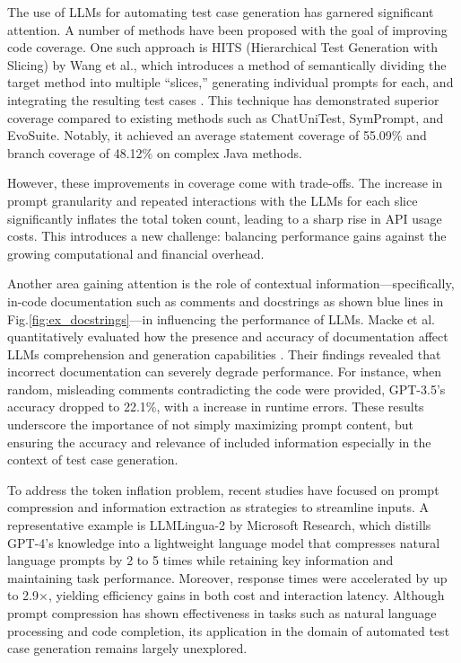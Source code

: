 The use of LLMs for automating test case generation has garnered significant attention. A number of methods have been proposed with the goal of improving code coverage. One such approach is HITS (Hierarchical Test Generation with Slicing) by Wang et al., which introduces a method of semantically dividing the target method into multiple “slices,” generating individual prompts for each, and integrating the resulting test cases \cite{hits}. This technique has demonstrated superior coverage compared to existing methods such as ChatUniTest, SymPrompt, and EvoSuite. Notably, it achieved an average statement coverage of 55.09\% and branch coverage of 48.12\% on complex Java methods.

However, these improvements in coverage come with trade-offs. The increase in prompt granularity and repeated interactions with the LLMs for each slice significantly inflates the total token count, leading to a sharp rise in API usage costs. This introduces a new challenge: balancing performance gains against the growing computational and financial overhead.

Another area gaining attention is the role of contextual information—specifically, in-code documentation such as comments and docstrings as shown blue lines in Fig.\ref{fig:ex_docstrings}—in influencing the performance of LLMs. Macke et al. quantitatively evaluated how the presence and accuracy of documentation affect LLMs comprehension and generation capabilities \cite{testing_the_effect_of_code_documentation}. Their findings revealed that incorrect documentation can severely degrade performance. For instance, when random, misleading comments contradicting the code were provided, GPT-3.5’s accuracy dropped to 22.1\%, with a increase in runtime errors. These results underscore the importance of not simply maximizing prompt content, but ensuring the accuracy and relevance of included information especially in the context of test case generation.

To address the token inflation problem, recent studies have focused on prompt compression and information extraction as strategies to streamline inputs. A representative example is LLMLingua-2 by Microsoft Research, which distills GPT-4’s knowledge into a lightweight language model that compresses natural language prompts by 2 to 5 times while retaining key information and maintaining task performance. Moreover, response times were accelerated by up to 2.9×, yielding efficiency gains in both cost and interaction latency. Although prompt compression has shown effectiveness in tasks such as natural language processing and code completion, its application in the domain of automated test case generation remains largely unexplored.

